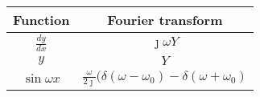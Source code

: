     \begin{tabular}{|c|c|} 
      \hline
\textbf{Function} & \textbf{Fourier transform}\\\hline
         $\frac{dy}{dx}$& $\jmath \omega Y$ \\\hline
          $y$&$Y$\\\hline
          $\sin{\omega x}$& $\frac{\omega}{2\jmath}(\delta(\omega-\omega_0)-\delta(\omega+\omega_0)$  \\ \hline
    \end{tabular}
